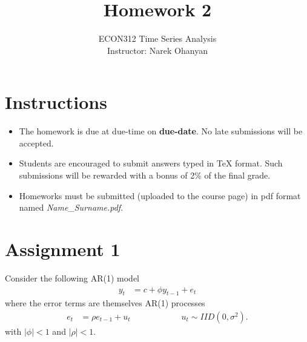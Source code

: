 \documentclass[12pt]{article}
\title{\textbf{Homework 2}}
\author{ECON312 Time Series Analysis \\ Instructor: Narek Ohanyan}
\date{}
\begin{document}
\maketitle


\section*{Instructions}

\begin{itemize}
    \item The homework is due at due-time on \textbf{due-date}. No late submissions will be accepted.
    \item Students are encouraged to submit answers typed in TeX format. Such submissions will be rewarded with a bonus of 2\% of the final grade.
    \item Homeworks must be submitted (uploaded to the course page) in pdf format named \textit{Name\_Surname.pdf}.
\end{itemize}


\section*{Assignment 1}

Consider the following AR(1) model
\begin{align*}
    y_{t} & = c + \phi y_{t-1} + e_{t}
\end{align*}
where the error terms are themselves AR(1) processes
\begin{align*}
    e_{t} & = \rho e_{t-1} + u_{t} \qquad\qquad\qquad u_{t} \sim IID(0,\sigma^2).
\end{align*}
with $ | \phi | < 1 $ and $ | \rho | < 1 $.
\end{document}
